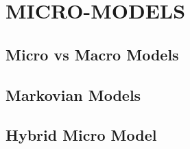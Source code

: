 \chapter{MICRO-MODELS}

\section{Micro vs Macro Models}

\section{Markovian Models}

\section{Hybrid Micro Model}